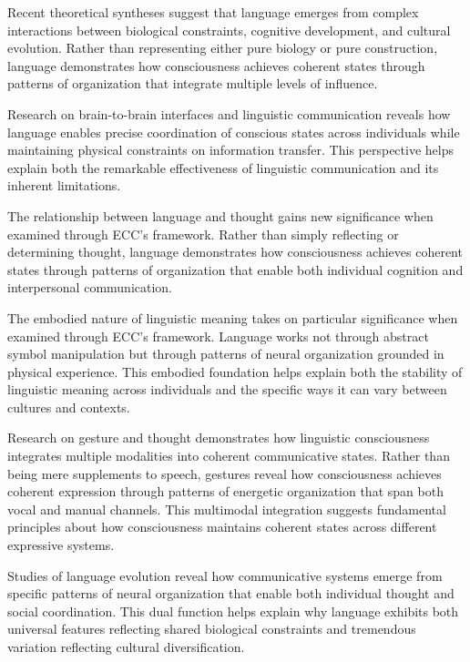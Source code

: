Recent theoretical syntheses \cite{Christiansen2016} suggest that language emerges from complex interactions between biological constraints, cognitive development, and cultural evolution. Rather than representing either pure biology or pure construction, language demonstrates how consciousness achieves coherent states through patterns of organization that integrate multiple levels of influence.

Research on brain-to-brain interfaces and linguistic communication \cite{Dingemanse2017} reveals how language enables precise coordination of conscious states across individuals while maintaining physical constraints on information transfer. This perspective helps explain both the remarkable effectiveness of linguistic communication and its inherent limitations.

The relationship between language and thought \cite{Whorf1956} gains new significance when examined through ECC's framework. Rather than simply reflecting or determining thought, language demonstrates how consciousness achieves coherent states through patterns of organization that enable both individual cognition and interpersonal communication.

The embodied nature of linguistic meaning \cite{Lakoff1999} takes on particular significance when examined through ECC's framework. Language works not through abstract symbol manipulation but through patterns of neural organization grounded in physical experience. This embodied foundation helps explain both the stability of linguistic meaning across individuals and the specific ways it can vary between cultures and contexts.

Research on gesture and thought \cite{McNeill2005} demonstrates how linguistic consciousness integrates multiple modalities into coherent communicative states. Rather than being mere supplements to speech, gestures reveal how consciousness achieves coherent expression through patterns of energetic organization that span both vocal and manual channels. This multimodal integration suggests fundamental principles about how consciousness maintains coherent states across different expressive systems.

Studies of language evolution \cite{Hauser2002} reveal how communicative systems emerge from specific patterns of neural organization that enable both individual thought and social coordination. This dual function helps explain why language exhibits both universal features reflecting shared biological constraints and tremendous variation reflecting cultural diversification.

